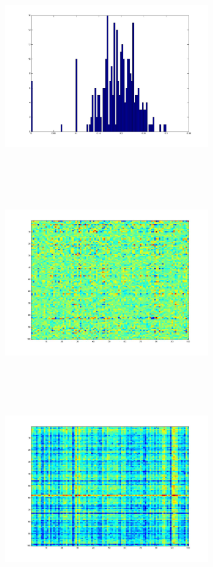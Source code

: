 \includegraphics[width=9.0cm,height=9.0cm]{images/GraphTheory/ClusterCoeff_Hist_ScaleFree_with20ExtraNode_5maxE_mean_0_190053489673149.jpg}
\includegraphics[width=9.0cm,height=9.0cm]{images/GraphTheory/CVX_NNMF_A-YX_Where_Y_X_PSD.jpg}
\includegraphics[width=9.0cm,height=9.0cm]{images/GraphTheory/CVX_NNMF_A.jpg}

